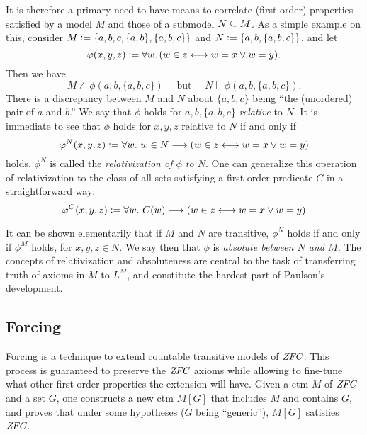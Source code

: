It is therefore a primary need to have means to correlate  (first-order)
properties satisfied by a model $M$ and those of a 
submodel $N\subseteq M$. As a simple example on this, consider 
$M\mathrel{\mathop:}= \{a,b,c, \{a,b\},\{a,b,c\}\}$ and
$N\mathrel{\mathop:}=\{a,b,\{a,b,c\}\}$, and let 
\[
\varphi(x,y,z)\mathrel{\mathop:}= \forall w.\,( w\in z \longleftrightarrow w=x \vee w=y).
\]
Then we have
\[
M\not\models \phi(a,b,\{a,b,c\}) \quad\text{ but }\quad N\models \phi(a,b,\{a,b,c\}).
\]
There is a discrepancy between  $M$ and $N$ about $\{a,b,c\}$ being ``the
(unordered) pair of $a$ and $b$.'' We say that $\phi$ holds for
$a,b,\{a,b,c\}$ \emph{relative} to $N$. It is immediate to see that
$\phi$ holds  for $x,y,z$ relative to $N$ if and only if
\[
\varphi^N(x,y,z)\mathrel{\mathop:}= \forall w.\ w\in N\longrightarrow ( w\in z \longleftrightarrow w=x \vee w=y)
\] 
holds. $\phi^N$ is called the \emph{relativization of $\phi$ to
  $N$}. One can generalize this operation of relativization to the
class of all sets satisfying a first-order predicate $C$ in a
straightforward way:
\[
\varphi^C(x,y,z)\mathrel{\mathop:}= \forall w.\ C(w)\longrightarrow ( w\in z \longleftrightarrow w=x \vee w=y)
\] 

It can be shown elementarily that if $M$ and $N$ are transitive,
$\phi^N$ holds if and only if $\phi^M$ holds,  for $x,y,z\in N$. We
say then that $\phi$ is \emph{absolute between $N$ and $M$.}
The concepts of relativization and absoluteness are central to the
task of transferring truth of axioms in $M$ to $L^M$, and constitute
the hardest part of Paulson's development.


\subsection{Forcing}
Forcing is a technique to extend countable transitive models of
$\mathit{ZFC}$. This process is guaranteed to preserve the $\mathit{ZFC}$
axioms while allowing to fine-tune what other first order properties the
extension will have. Given a ctm $M$  of $\mathit{ZFC}$ and a set $G$, one constructs a new
ctm  $M[G]$  that includes $M$ and
contains $G$, and proves that under some hypotheses ($G$ being ``generic''),
$M[G]$ satisfies $\mathit{ZFC}$.

